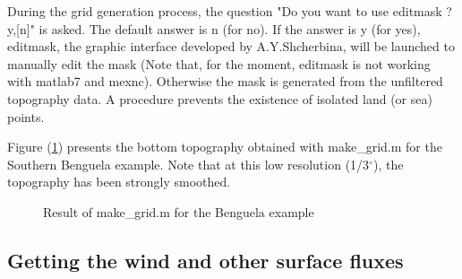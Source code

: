 During the grid generation process, the question 
"Do you want to use editmask ? y,[n]" is asked. The default answer is n (for no).
If the answer is y (for yes), editmask, the  graphic interface developed 
by A.Y.Shcherbina, will be launched to manually edit the mask 
(Note that, for the moment, editmask is not working with matlab7 and mexnc).
Otherwise the
mask is generated from the unfiltered topography data. A procedure prevents 
the existence of isolated land (or sea) points.

Figure (\ref{fig:grid}) presents the
bottom topography obtained with make\_grid.m for the
Southern Benguela example. Note that at this low
resolution (1/3$^\circ$), the topography has been strongly
smoothed.

\begin{figure}[h!]
\centerline{}
\caption{Result of make\_grid.m for the Benguela example}
\label{fig:grid}
\end{figure}


\subsection{Getting the wind and other surface fluxes}

